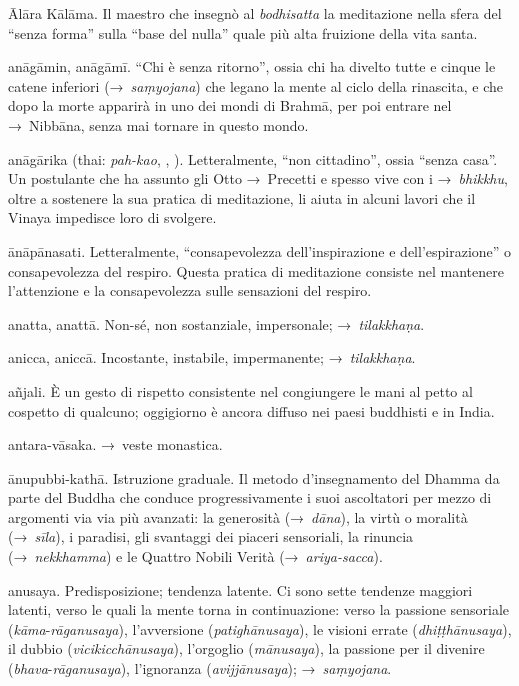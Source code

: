 \begin{glossarydescription}
\item[Ālāra Kālāma.] Il maestro che insegnò al \emph{bodhisatta} la meditazione
  nella sfera del ``senza forma'' sulla ``base del nulla'' quale più alta
  fruizione della vita santa.

\item[anāgāmin, anāgāmī.] ``Chi è senza ritorno'', ossia chi ha divelto
  tutte e cinque le catene inferiori (→~\emph{saṃyojana}) che legano la mente al
  ciclo della rinascita, e che dopo la morte apparirà in uno dei mondi di
  Brahmā, per poi entrare nel →~Nibbāna, senza mai tornare in questo
  mondo.

\item[anāgārika] (thai: \emph{pah-kao}, , ).
  Letteralmente, ``non cittadino'', ossia ``senza casa''. Un postulante che ha
  assunto gli Otto →~Precetti e spesso vive con i →~\emph{bhikkhu}, oltre a
  sostenere la sua pratica di meditazione, li aiuta in alcuni lavori che il
  Vinaya impedisce loro di svolgere.

\item[ānāpānasati.] Letteralmente, ``consapevolezza dell'inspirazione e
  dell'espirazione'' o consapevolezza del respiro. Questa pratica di meditazione
  consiste nel mantenere l'attenzione e la consapevolezza sulle sensazioni del
  respiro.

\item[anatta, anattā.] Non-sé, non sostanziale, impersonale;
  →~\emph{tilakkhaṇa}.

\item[anicca, aniccā.] Incostante, instabile, impermanente;
  →~\emph{tilakkhaṇa}.

\item[añjali.] È un gesto di rispetto consistente nel congiungere le mani
  al petto al cospetto di qualcuno; oggigiorno è ancora diffuso nei paesi
  buddhisti e in India.

\item[antara-vāsaka.] →~veste monastica.

\item[ānupubbi-kathā.] Istruzione graduale. Il metodo d'insegnamento del
  Dhamma da parte del Buddha che conduce progressivamente i suoi ascoltatori per
  mezzo di argomenti via via più avanzati: la generosità (→~\emph{dāna}), la
  virtù o moralità (→~\emph{sīla}), i paradisi, gli svantaggi dei piaceri
  sensoriali, la rinuncia (→~\emph{nekkhamma}) e le Quattro Nobili Verità
  (→~\emph{ariya-sacca}).

\item[anusaya.] Predisposizione; tendenza latente. Ci sono sette tendenze
  maggiori latenti, verso le quali la mente torna in continuazione: verso la
  passione sensoriale (\emph{kāma}-\emph{rāganusaya}), l'avversione
  (\emph{patighānusaya}), le visioni errate (\emph{dhiṭṭhānusaya}), il dubbio
  (\emph{vicikicchānusaya}), l'orgoglio (\emph{mānusaya}), la passione per il
  divenire (\emph{bhava}-\emph{rāganusaya}), l'ignoranza (\emph{avijjānusaya});
  →~\emph{saṃyojana}.


\end{glossarydescription}
